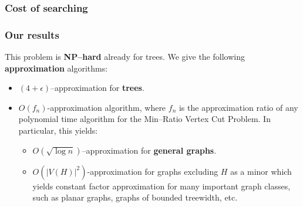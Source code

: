 \documentclass{beamer}
\newcommand{\br}[1]{\mathopen{}\left( #1 \right)}
\newcommand{\spr}[1]{\mathopen{}\left| #1 \right|}
\begin{document}

\begin{frame}
\frametitle{Cost of searching}

\end{frame}

\begin{frame}
\frametitle{Our results}
This problem is \textbf{NP–hard} already for trees. We give the following \textbf{approximation} algorithms:
\begin{itemize}
    \item $\br{4+\epsilon}$–approximation for \textbf{trees}.
    \pause
    \item $O\br{f_n}$-approximation algorithm, where $f_n$ is the approximation ratio of any polynomial time algorithm for the Min–Ratio Vertex Cut Problem. In particular, this yields:
    \begin{itemize}
        \pause
        \item $O\br{\sqrt{\log n}}$–approximation for \textbf{general graphs}.
        \item $O\br{\spr{V\br{H}}^2}$-approximation for graphs excluding $H$ as a minor which yields constant factor approximation for many important graph classes, such as planar graphs, graphs of bounded treewidth, etc.
    \end{itemize}
\end{itemize}
\end{frame}
\end{document}
